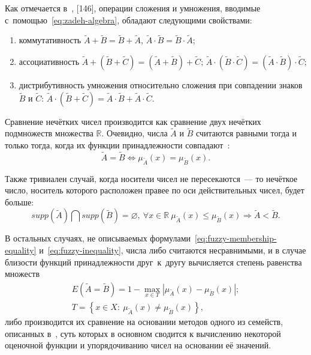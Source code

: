 Как отмечается в~\cite{Pospelov, Borisov_Alexeev_Msk, Yakhyaeva}, [146], операции сложения и умножения, вводимые с~помощью~\eqref{eq:zadeh-algebra}, обладают следующими свойствами:
\begin{enumerate}
	\item коммутативность $\tilde{A}+\tilde{B}=\tilde{B}+\tilde{A}$, $\tilde{A}\cdot \tilde{B}=\tilde{B}\cdot \tilde{A}$;
	\item ассоциативность $\tilde{A}+\left( \tilde{B}+\tilde{C} \right)=\left( \tilde{A}+\tilde{B} \right)+\tilde{C}$; $\tilde{A}\cdot \left( \tilde{B}\cdot \tilde{C} \right)=\left( \tilde{A}\cdot \tilde{B} \right)\cdot \tilde{C}$;
	\item дистрибутивность умножения относительно сложения при совпадении знаков $\tilde{B}$ и $\tilde{C}$: $\tilde{A}\cdot \left( \tilde{B}+\tilde{C} \right)=\tilde{A}\cdot \tilde{B}+\tilde{A}\cdot \tilde{C}$.
\end{enumerate}

Сравнение нечётких чисел производится как сравнение двух нечётких подмножеств множества $\mathbb{R}$. Очевидно, числа $\tilde A$ и $\tilde B$ считаются равными тогда и только тогда, когда их функции принадлежности совпадают~\cite{Ibragimov}:
\begin{equation}
\label{eq:fuzzy-membership-equality}
  \tilde A = \tilde B \Leftrightarrow \mu_{\tilde A} \left( x \right) = \mu_{\tilde B} \left( x \right).
\end{equation}

Также тривиален случай, когда носители чисел не пересекаются~--- то нечёткое число, носитель которого расположен правее по оси действительных чисел, будет больше:
\begin{equation}
\label{eq:fuzzy-inequality}
  supp \left( \tilde A \right) \bigcap supp \left( \tilde B \right) = \varnothing,\ \forall x \in \mathbb{R}\ \mu_{\tilde A} \left( x \right) \leqslant \mu_{\tilde B} \left( x \right) \Rightarrow \tilde A < \tilde B.
\end{equation}

В остальных случаях, не описываемых формулами~\eqref{eq:fuzzy-membership-equality} и~\eqref{eq:fuzzy-inequality}, числа либо считаются несравнимыми, и в случае близости функций принадлежности друг~к~другу вычисляется степень равенства множеств~\cite{Rutkovskaya}
\begin{gather*}
  E\left(\tilde A = \tilde B \right)=1 - \underset{x \in T} {\mathop{\max}} \left| \mu_{\tilde A} \left( x \right) - \mu_{\tilde B} \left( x \right) \right|; \\
  T = \left \{ x \in X:\ \mu_{\tilde A} \left( x \right) \neq \mu_{\tilde B} \left( x \right) \right \},
\end{gather*}
либо производится их сравнение на основании методов одного из семейств, описанных в~\cite{Vorontsov_Compare, Cheng_Comparison}, суть которых в основном сводится к вычислению некоторой оценочной функции и упорядочиванию чисел на основании её значений.

